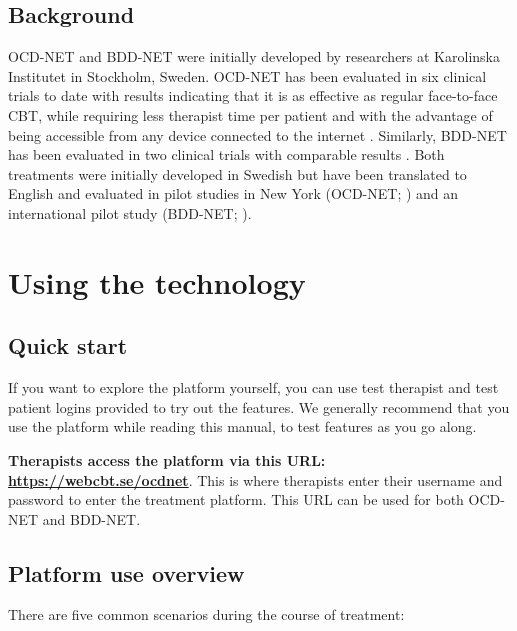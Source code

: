 \documentclass[]{book}
\begin{document}
\hypertarget{background}{%
\section{Background}\label{background}}

OCD-NET and BDD-NET were initially developed by researchers at Karolinska Institutet in Stockholm, Sweden. OCD-NET has been evaluated in six clinical trials to date with results indicating that it is as effective as regular face-to-face CBT, while requiring less therapist time per patient and with the advantage of being accessible from any device connected to the internet \citep{andersson2011, andersson2012, andersson2014, andersson2015, ruck2018}. Similarly, BDD-NET has been evaluated in two clinical trials with comparable results \citep{enander2014, enander2016, enander2019}. Both treatments were initially developed in Swedish but have been translated to English and evaluated in pilot studies in New York (OCD-NET; \citet{patel2018a}) and an international pilot study (BDD-NET; \citet{gentile2019}).

\hypertarget{using-the-technology}{%
\chapter{Using the technology}\label{using-the-technology}}

\hypertarget{quick-start}{%
\section{Quick start}\label{quick-start}}

If you want to explore the platform yourself, you can use test therapist and test patient logins provided to try out the features. We generally recommend that you use the platform while reading this manual, to test features as you go along.

\textbf{Therapists access the platform via this URL: \url{https://webcbt.se/ocdnet}}. This is where therapists enter their username and password to enter the treatment platform. This URL can be used for both OCD-NET and BDD-NET.

\hypertarget{platform-use-overview}{%
\section{Platform use overview}\label{platform-use-overview}}

There are five common scenarios during the course of treatment:
\end{document}
